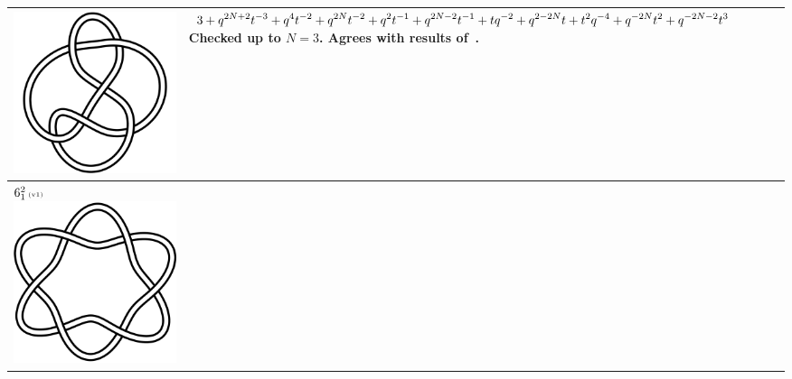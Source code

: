 \documentclass{compositio}
\theoremstyle{definition}
\numberwithin{equation}{section}
\begin{document}
{\begin{longtable}{p{}|p{}}
\includegraphics[scale=0.07,angle=0]{knot6_3.pdf} 
& 
\newline
$
\displaystyle{%
3+q^{2N+2} t^{-3} + q^4t^{-2}+ q^{2 N}t^{-2}+ q^2 t^{-1}+ q^{2 N-2}t^{-1}+ t q^{-2}+q^{2-2 N} t+ t^2q^{-4}+q^{-2 N} t^2+q^{-2N-2} t^3
}
$
\newline\newline\newline
Checked up to $N=3$. Agrees with results of~\cite{r0508510, r0607544}. 
\\
\hline
$6_{1}^2\,\text{{\tiny (v1)}}$ 
\includegraphics[scale=0.07,angle=0]{link6_1_2.pdf} 

\end{longtable}}
\end{document}
